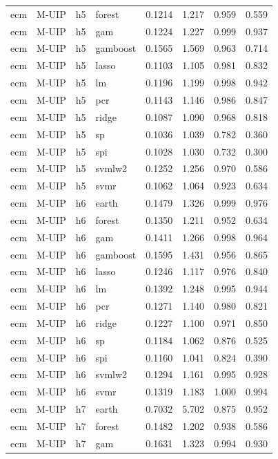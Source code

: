 \begin{ThreePartTable}
\begin{longtable}[t]{llclcccc}
ecm & M-UIP & h5 & forest & 0.1214 & 1.217 & 0.959 & 0.559\\
ecm & M-UIP & h5 & gam & 0.1224 & 1.227 & 0.999 & 0.937\\
ecm & M-UIP & h5 & gamboost & 0.1565 & 1.569 & 0.963 & 0.714\\
ecm & M-UIP & h5 & lasso & 0.1103 & 1.105 & 0.981 & 0.832\\
ecm & M-UIP & h5 & lm & 0.1196 & 1.199 & 0.998 & 0.942\\
ecm & M-UIP & h5 & pcr & 0.1143 & 1.146 & 0.986 & 0.847\\
ecm & M-UIP & h5 & ridge & 0.1087 & 1.090 & 0.968 & 0.818\\
ecm & M-UIP & h5 & sp & 0.1036 & 1.039 & 0.782 & 0.360\\
ecm & M-UIP & h5 & spi & 0.1028 & 1.030 & 0.732 & 0.300\\
ecm & M-UIP & h5 & svmlw2 & 0.1252 & 1.256 & 0.970 & 0.586\\
ecm & M-UIP & h5 & svmr & 0.1062 & 1.064 & 0.923 & 0.634\\
\addlinespace
ecm & M-UIP & h6 & earth & 0.1479 & 1.326 & 0.999 & 0.976\\
ecm & M-UIP & h6 & forest & 0.1350 & 1.211 & 0.952 & 0.634\\
ecm & M-UIP & h6 & gam & 0.1411 & 1.266 & 0.998 & 0.964\\
ecm & M-UIP & h6 & gamboost & 0.1595 & 1.431 & 0.956 & 0.865\\
ecm & M-UIP & h6 & lasso & 0.1246 & 1.117 & 0.976 & 0.840\\
ecm & M-UIP & h6 & lm & 0.1392 & 1.248 & 0.995 & 0.944\\
ecm & M-UIP & h6 & pcr & 0.1271 & 1.140 & 0.980 & 0.821\\
ecm & M-UIP & h6 & ridge & 0.1227 & 1.100 & 0.971 & 0.850\\
ecm & M-UIP & h6 & sp & 0.1184 & 1.062 & 0.876 & 0.525\\
ecm & M-UIP & h6 & spi & 0.1160 & 1.041 & 0.824 & 0.390\\
ecm & M-UIP & h6 & svmlw2 & 0.1294 & 1.161 & 0.995 & 0.928\\
ecm & M-UIP & h6 & svmr & 0.1319 & 1.183 & 1.000 & 0.994\\
\addlinespace
ecm & M-UIP & h7 & earth & 0.7032 & 5.702 & 0.875 & 0.952\\
ecm & M-UIP & h7 & forest & 0.1482 & 1.202 & 0.938 & 0.586\\
ecm & M-UIP & h7 & gam & 0.1631 & 1.323 & 0.994 & 0.930\\

\end{longtable}
\end{ThreePartTable}
